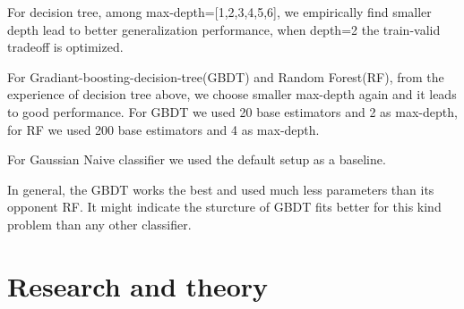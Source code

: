 \documentclass[runningheads]{llncs}
\begin{document}
For decision tree, among max-depth=[1,2,3,4,5,6], we empirically find smaller depth lead to better generalization performance, when depth=2 the train-valid tradeoff is optimized.

For Gradiant-boosting-decision-tree(GBDT) and Random Forest(RF), from the experience of decision tree above, we choose smaller max-depth again and it leads to good performance. For GBDT we used 20 base estimators and 2 as max-depth, for RF we used 200 base estimators and 4 as max-depth.

For Gaussian Naive classifier we used the default setup as a baseline.

In general, the GBDT works the best and used much less parameters than its opponent RF. It might indicate the sturcture of GBDT fits better for this kind problem than any other classifier.



\section{Research and theory}
\end{document}
